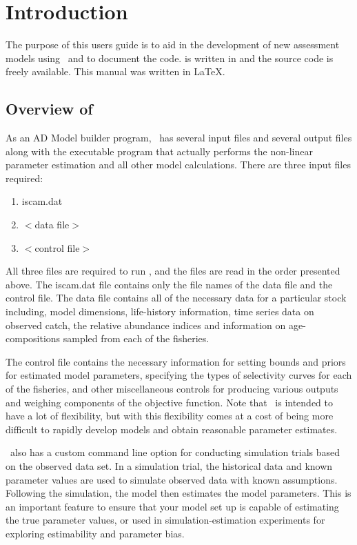 \section{Introduction} %
\label{sec:introduction}
\begin{multicols}{2}
	The purpose of this users guide is to aid in the development of new assessment models using \iscam\ and to document the code. \iscam{} is written in \admb{} and the source code is freely available.  This manual was written in \LaTeX{}.

\subsection{Overview of \iscam} %
\label{sub:overview}
As an AD Model builder program, \iscam\ has several input files and several output files along with the executable program that actually performs the non-linear parameter estimation and all other model calculations.  There are three input files required:
\begin{enumerate}
	\item iscam.dat
	\item $<$data file$>$
	\item $<$control file$>$
\end{enumerate}
 All three files are required to run \iscam, and the files are read in the order presented above.  The iscam.dat file contains only the file names of the data file and the control file.  The data file contains all of the necessary data for a particular stock including, model dimensions, life-history information, time series data on observed catch, the relative abundance indices and information on age-compositions sampled from each of the fisheries.
 
 The control file contains the necessary information for setting bounds and priors for estimated model parameters, specifying the types of selectivity curves for each of the fisheries, and other miscellaneous controls for producing various outputs and weighing components of the objective function.  Note that \iscam\ is intended to have a lot of flexibility, but with this flexibility comes at a cost of being more difficult to rapidly develop models and obtain reasonable parameter estimates.
 
 \iscam\ also has a custom command line option for conducting simulation trials based on the observed data set. In a simulation trial, the historical data and known parameter values are used to simulate observed data with known assumptions. Following the simulation, the model then estimates the model parameters.   This is an important feature to ensure that your model set up is capable of estimating the true parameter values, or used in simulation-estimation experiments for exploring estimability and parameter bias.
 

\end{multicols}
